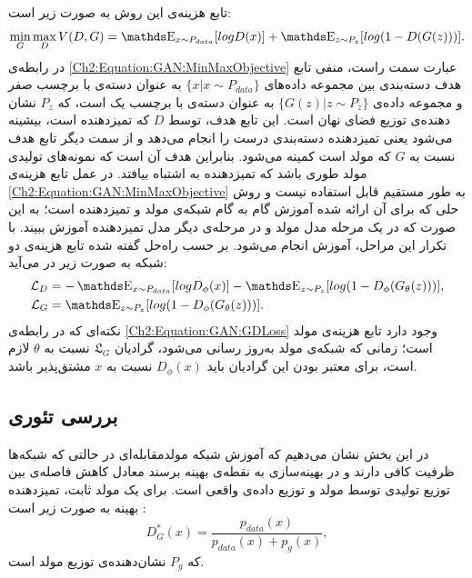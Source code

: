   \newline
  تابع هزینه‌‌ی این روش به صورت زیر است:
  \begin{equation}\label{Ch2:Equation:GAN:MinMaxObjective}
  \min_G \max_D V(D, G) = \ME_{x \sim P_{data}} [log D(x)] + \ME_{z \sim P_z} [log(1-D(G(z)))].
  \end{equation}
  در رابطه‌ی
  \ref{Ch2:Equation:GAN:MinMaxObjective}
  عبارت سمت راست، منفی تابع هدف دسته‌بندی بین مجموعه داده‌های 
  $\{x | x \sim P_{data}\}$
  به عنوان دسته‌ی با برچسب صفر
  و مجموعه داده‌ی
  $\{G(z) | z \sim P_z\}$
به عنوان دسته‌ی با برچسب یک است، که
$P_z$
نشان دهنده‌ی توزیع فضای نهان است. این تابع هدف، توسط $D$ که تمیزدهنده است، بیشینه می‌شود یعنی تمیزدهنده دسته‌بندی درست را انجام می‌دهد و از سمت دیگر تابع هدف نسبت به $G$ که مولد است کمینه می‌شود. بنابراین هدف آن است که نمونه‌های تولیدی مولد طوری باشد که تمیزدهنده به اشتباه بیافتد.
\newline
در عمل تابع هزینه‌ی 
  \ref{Ch2:Equation:GAN:MinMaxObjective}
  به طور مستقیم قابل استفاده نیست و روش حلی که برای آن ارائه شده آموزش گام به گام شبکه‌ی مولد و تمیزدهنده است؛ به این صورت که در یک مرحله مدل مولد و در مرحله‌ی دیگر مدل تمیزدهنده آموزش ببیند. با تکرار این مراحل، آموزش انجام می‌شود. بر حسب راه‌حل گفته شده تابع هزینه‌ی دو شبکه به صورت زیر در می‌آید:
  \begin{equation}\label{Ch2:Equation:GAN:GDLoss}
  \begin{split}
  \mathcal{L}_D &= - \ME_{x \sim P_{data}} [log D_\phi(x)] - \ME_{z \sim P_z} [log(1-D_\phi(G_\theta(z)))],\\
  \mathcal{L}_G &= \ME_{z \sim P_z} [log(1-D_\phi(G_\theta(z)))].
  \end{split}
  \end{equation}
نکته‌ای که در رابطه‌ی
\ref{Ch2:Equation:GAN:GDLoss}
وجود دارد تابع هزینه‌ی مولد است؛ زمانی که شبکه‌ی مولد به‌روز رسانی می‌شود، گرادیان
$  \mathfrak{L}_G$
نسبت به
$\theta$
لازم است، برای معتبر بودن این گرادیان باید
$D_\phi(x)$
نسبت به $x$ مشتق‌پذیر باشد.
\subsection{بررسی تئوری}\label{Section:GAN:TheoreticalAnalysis}
در این بخش نشان می‌دهیم که آموزش شبکه‌ مولدمقابله‌ای در حالتی که شبکه‌ها ظرفیت کافی دارند و در بهینه‌سازی به نقطه‌ی بهینه برسند معادل کاهش فاصله‌ی 
بین توزیع تولیدی توسط مولد و توزیع داده‌ی واقعی است.
\theorem
\label{Theorem:GAN:OptimalDiscriminator}
برای یک مولد ثابت، تمیزدهنده بهینه به صورت زیر است
 \cite{Goodfellow2014}:
\begin{equation}
D^*_G(x) = \frac{p_{data}(x)}{p_{data}(x)+p_g(x)},
\end{equation}
که
$P_g$
نشان‌دهنده‌ی توزیع مولد است.


